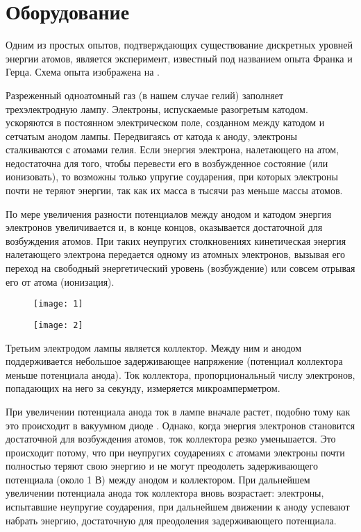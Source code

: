 \documentclass[a4paper, 12pt]{article}
\begin{document}
\section{Оборудование}
Одним из простых опытов, подтверждающих существование дискретных
уровней энергии атомов, является эксперимент, известный под названием
опыта Франка и Герца. Схема опыта изображена на . 

Разреженный одноатомный газ (в нашем случае гелий) заполняет
трехэлектродную лампу. Электроны, испускаемые разогретым катодом.
ускоряются в постоянном электрическом поле, созданном между катодом и
сетчатым анодом лампы. Передвигаясь от катода к аноду, электроны
сталкиваются с атомами гелия. Если энергия электрона, налетающего на
атом, недостаточна для того, чтобы перевести его в возбужденное
состояние (или ионизовать), то возможны только упругие соударения, при
которых электроны почти не теряют энергии, так как их масса в тысячи
раз меньше массы атомов.

По мере увеличения разности потенциалов между анодом и катодом энергия
электронов увеличивается и, в конце концов, оказывается достаточной
для возбуждения атомов. При таких неупругих столкновениях кинетическая
энергия налетающего электрона передается одному из атомных электронов,
вызывая его переход на свободный энергетический уровень (возбуждение)
или совсем отрывая его от атома (ионизация).

\begin{figure}[H]
    \begin{floatrow}

        {
        \texttt{[image: 1]}
    }

        {
        \texttt{[image: 2]}
    }
    \end{floatrow}
\end{figure}




Третьим электродом лампы является коллектор. Между ним и анодом
поддерживается небольшое задерживающее напряжение (потенциал
коллектора меньше потенциала анода). Ток коллектора, пропорциональный
числу электронов, попадающих на него за секунду, измеряется микроамперметром.

При увеличении потенциала анода ток в лампе вначале растет, подобно
тому как это происходит в вакуумном диоде . Однако, когда
энергия электронов становится достаточной для возбуждения атомов, ток
коллектора резко уменьшается. Это происходит потому, что при неупругих
соударениях с атомами электроны почти полностью теряют свою энергию и
не могут преодолеть задерживающего потенциала (около 1 В) между анодом
и коллектором. При дальнейшем увеличении потенциала анода ток
коллектора вновь возрастает: электроны, испытавшие неупругие
соударения, при дальнейшем движении к аноду успевают набрать энергию,
достаточную для преодоления задерживающего потенциала.
\end{document}
